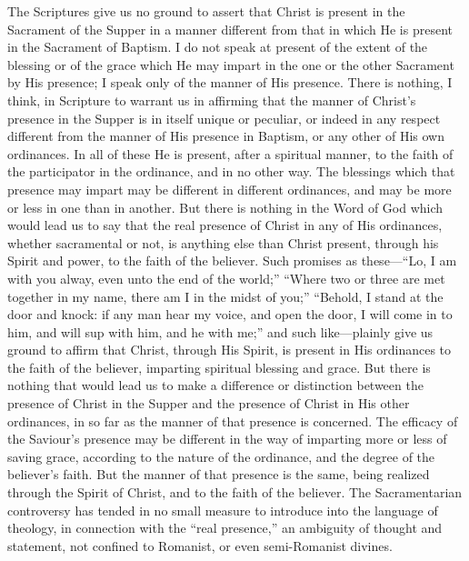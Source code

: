 \documentclass[]{book}
\begin{document}
The Scriptures give us no ground to assert that Christ is present in the Sacrament of the Supper in a manner different from that in which He is present in the Sacrament of Baptism. I do not speak at present of the extent of the blessing or of the grace which He may impart in the one or the other Sacrament by His presence; I speak only of the manner of His presence. There is nothing, I think, in Scripture to warrant us in affirming that the manner of Christ's presence in the Supper is in itself unique or peculiar, or indeed in any respect different from the manner of His presence in Baptism, or any other of His own ordinances. In all of these He is present, after a spiritual manner, to the faith of the participator in the ordinance, and in no other way. The blessings which that presence may impart may be different in different ordinances, and may be more or less in one than in another. But there is nothing in the Word of God which would lead us to say that the real presence of Christ in any of His ordinances, whether sacramental or not, is anything else than Christ present, through his Spirit and power, to the faith of the believer. Such promises as these---``Lo, I am with you alway, even unto the end of the world;'' ``Where two or three are met together in my name, there am I in the midst of you;'' ``Behold, I stand at the door and knock: if any man hear my voice, and open the door, I will come in to him, and will sup with him, and he with me;'' and such like---plainly give us ground to affirm that Christ, through His Spirit, is present in His ordinances to the faith of the believer, imparting spiritual blessing and grace. But there is nothing that would lead us to make a difference or distinction between the presence of Christ in the Supper and the presence of Christ in His other ordinances, in so far as the manner of that presence is concerned. The efficacy of the Saviour's presence may be different in the way of imparting more or less of saving grace, according to the nature of the ordinance, and the degree of the believer's faith. But the manner of that presence is the same, being realized through the Spirit of Christ, and to the faith of the believer. The Sacramentarian controversy has tended in no small measure to introduce into the language of theology, in connection with the ``real presence,'' an ambiguity of thought and statement, not confined to Romanist, or even semi-Romanist divines.
\end{document}
